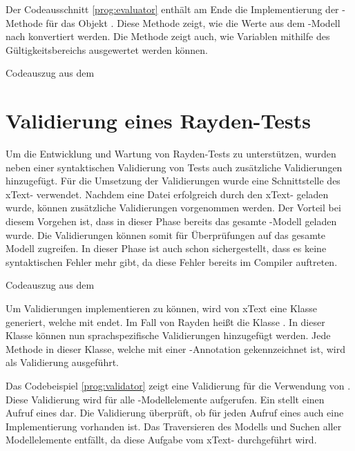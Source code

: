 \SuperPar
Der Codeausschnitt \ref{prog:evaluator} enthält am Ende die Implementierung der -Methode für das Objekt . Diese Methode zeigt, wie die Werte aus dem -Modell nach  konvertiert werden. Die Methode zeigt auch, wie Variablen mithilfe des Gültigkeitsbereichs ausgewertet werden können.

\begin{program}

\caption{Codeauszug aus dem }
\label{prog:evaluator}
\end{program}

\clearpage
\section{Validierung eines Rayden-Tests}
\label{cha:validateKeyword}

Um die Entwicklung und Wartung von Rayden-Tests zu unterstützen, wurden neben einer syntaktischen Validierung von Tests auch zusätzliche Validierungen hinzugefügt. Für die Umsetzung der Validierungen wurde eine Schnittstelle des xText- verwendet. Nachdem eine Datei erfolgreich durch den xText- geladen wurde, können zusätzliche Validierungen vorgenommen werden. Der Vorteil bei diesem Vorgehen ist, dass in dieser Phase bereits das gesamte -Modell geladen wurde. Die Validierungen können somit für Überprüfungen auf das gesamte Modell zugreifen. In dieser Phase ist auch schon sichergestellt, dass es keine syntaktischen Fehler mehr gibt, da diese Fehler bereits im Compiler auftreten.

\begin{program}

\caption{Codeauszug aus dem }
\label{prog:validator}
\end{program}

\SuperPar
Um Validierungen implementieren zu können, wird von xText eine Klasse generiert, welche mit  endet. Im Fall von Rayden heißt die Klasse . In dieser Klasse können nun sprachspezifische Validierungen hinzugefügt werden. Jede Methode in dieser Klasse, welche mit einer -Annotation gekennzeichnet ist, wird als Validierung ausgeführt. 

\SuperPar
Das Codebeispiel \ref{prog:validator} zeigt eine Validierung für die Verwendung von . Diese Validierung wird für alle -Modellelemente aufgerufen. Ein  stellt einen Aufruf eines  dar. Die Validierung überprüft, ob für jeden Aufruf eines  auch eine Implementierung vorhanden ist. Das Traversieren des Modells und Suchen aller Modellelemente entfällt, da diese Aufgabe vom xText- durchgeführt wird.

